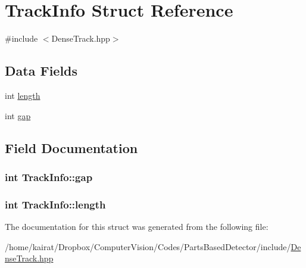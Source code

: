 \hypertarget{structTrackInfo}{}\section{Track\+Info Struct Reference}
\label{structTrackInfo}


{\ttfamily \#include $<$Dense\+Track.\+hpp$>$}

\subsection*{Data Fields}
\begin{DoxyCompactItemize}
\item 
int \hyperlink{structTrackInfo_a25aefb118714f72dee6064d487a63108}{length}
\item 
int \hyperlink{structTrackInfo_a06a08d0d3fc9528ccfb37329fd3b8f18}{gap}
\end{DoxyCompactItemize}


\subsection{Field Documentation}
\hypertarget{structTrackInfo_a06a08d0d3fc9528ccfb37329fd3b8f18}{}
\subsubsection[{gap}]{\setlength{\rightskip}{0pt plus 5cm}int Track\+Info\+::gap}\label{structTrackInfo_a06a08d0d3fc9528ccfb37329fd3b8f18}
\hypertarget{structTrackInfo_a25aefb118714f72dee6064d487a63108}{}
\subsubsection[{length}]{\setlength{\rightskip}{0pt plus 5cm}int Track\+Info\+::length}\label{structTrackInfo_a25aefb118714f72dee6064d487a63108}


The documentation for this struct was generated from the following file\+:\begin{DoxyCompactItemize}
\item 
/home/kairat/\+Dropbox/\+Computer\+Vision/\+Codes/\+Parts\+Based\+Detector/include/\hyperlink{DenseTrack_8hpp}{Dense\+Track.\+hpp}\end{DoxyCompactItemize}
